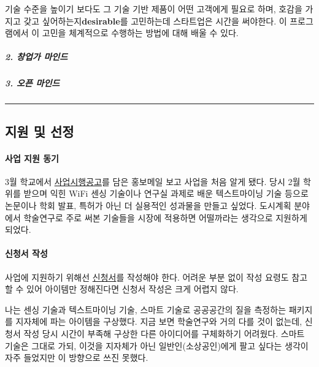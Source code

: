 \documentclass[
  letterpaper,
  DIV=11,
  numbers=noendperiod]{scrartcl}
\let\oldparagraph\paragraph
\renewcommand{\paragraph}[1]{\oldparagraph{#1}\mbox{}}
\let\oldsubparagraph\subparagraph
\renewcommand{\subparagraph}[1]{\oldsubparagraph{#1}\mbox{}}
\begin{document}
기술 수준을 높이기 보다도 그 기술 기반 제품이 어떤 고객에게 필요로 하며,
호감을 가지고 갖고 싶어하는지\textbf{desirable}를 고민하는데 스타트업은
시간을 써야한다. 이 프로그램에서 이 고민을 체계적으로 수행하는 방법에
대해 배울 수 있다.

\hypertarget{uxcc3duxc5c5uxac00-uxb9c8uxc778uxb4dc}{%
\subparagraph{2. 창업가
마인드}\label{uxcc3duxc5c5uxac00-uxb9c8uxc778uxb4dc}}

\hypertarget{uxc624uxd508-uxb9c8uxc778uxb4dc}{%
\subparagraph{3. 오픈 마인드}\label{uxc624uxd508-uxb9c8uxc778uxb4dc}}

\begin{center}\rule{0.5\linewidth}{0.5pt}\end{center}

\hypertarget{uxc9c0uxc6d0-uxbc0f-uxc120uxc815}{%
\subsection{지원 및 선정}\label{uxc9c0uxc6d0-uxbc0f-uxc120uxc815}}

\hypertarget{uxc0acuxc5c5-uxc9c0uxc6d0-uxb3d9uxae30}{%
\paragraph{사업 지원
동기}\label{uxc0acuxc5c5-uxc9c0uxc6d0-uxb3d9uxae30}}

3월 학교에서 \href{../file/projectAnnounce.hwp}{사업시행공고}를 담은
홍보메일 보고 사업을 처음 알게 됐다. 당시 2월 학위를 받으며 익힌 WiFi
센싱 기술이나 연구실 과제로 배운 텍스트마이닝 기술 등으로 논문이나 학회
발표, 특허가 아닌 더 실용적인 성과물을 만들고 싶었다. 도시계획 분야에서
학술연구로 주로 써본 기술들을 시장에 적용하면 어떨까라는 생각으로
지원하게 되었다.

\hypertarget{uxc2e0uxccaduxc11c-uxc791uxc131}{%
\paragraph{신청서 작성}\label{uxc2e0uxccaduxc11c-uxc791uxc131}}

사업에 지원하기 위해선 \href{../file/projectApplication.hwp}{신청서}를
작성해야 한다. 어려운 부분 없이 작성 요령도 참고할 수 있어 아이템만
정해진다면 신청서 작성은 크게 어렵지 않다.

나는 센싱 기술과 텍스트마이닝 기술, 스마트 기술로 공공공간의 질을
측정하는 패키지를 지자체에 파는 아이템을 구상했다. 지금 보면 학술연구와
거의 다를 것이 없는데, 신청서 작성 당시 시간이 부족해 구상한 다른
아이디어를 구체화하기 어려웠다. 스마트 기술은 그대로 가되, 이것을
지자체가 아닌 일반인(소상공인)에게 팔고 싶다는 생각이 자주 들었지만 이
방향으로 쓰진 못했다.
\end{document}
